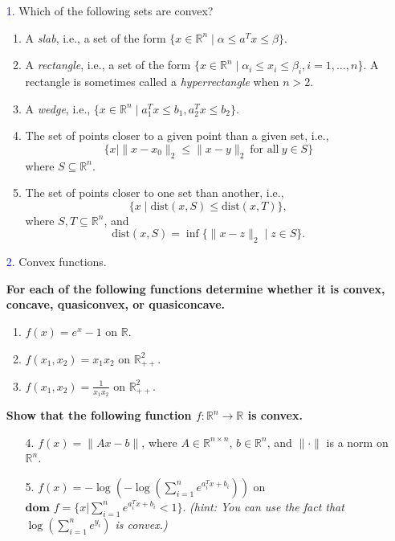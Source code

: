 \documentclass[10pt]{article}
\begin{document}
\begin{itemize}

	\item[\textcolor{blue}{1}.] Which of the following sets are convex?
	
	\begin{enumerate}
	    \item A \textit{slab}, i.e., a set of the form $\{x \in \mathbb{R}^n \mid \alpha \leq a^T x \leq \beta\}$. 
	    \item A \textit{rectangle}, i.e., a set of the form $\{x \in \mathbb{R}^n \mid \alpha_i \leq x_i \leq \beta_i, i = 1, \dots, n\}$. A rectangle is sometimes called a \textit{hyperrectangle} when 			$n > 2$. 
	    \item A \textit{wedge}, i.e., $\{x \in \mathbb{R}^n \mid a_1^T x \leq b_1, a_2^T x \leq b_2\}$. 
	    \item The set of points closer to a given point than a given set, i.e.,
	    \[
	    \{x \mid \|x - x_0\|_2 \leq \|x - y\|_2 \ \text{for all} \ y \in S\}
	    \]
	    where $S \subseteq \mathbb{R}^n$. 
	    \item The set of points closer to one set than another, i.e.,
	    \[
	    \{x \mid \text{dist}(x, S) \leq \text{dist}(x, T)\},
	    \]
	    where $S, T \subseteq \mathbb{R}^n$, and
	    \[
	    \text{dist}(x, S) = \inf \{\|x - z\|_2 \mid z \in S\}.
	    \] 
	\end{enumerate}
	\vspace{1cm}

	\item[\textcolor{blue}{2}.] Convex functions.

	\textbf{ For each of the following functions determine whether it is convex, concave, quasiconvex, or quasiconcave.}	
	\begin{enumerate}
	    \item $f(x) = e^x - 1$ on $\mathbb{R}$. 
	    \item $f(x_1, x_2) = x_1 x_2$ on $\mathbb{R}^2_{++}$. 
	    \item $f(x_1, x_2) = \frac{1}{x_1 x_2}$ on $\mathbb{R}^2_{++}$. 
	\end{enumerate}
	\textbf{Show that the following function $f : \mathbb{R}^n \to \mathbb{R}$ is convex.}	
	\begin{enumerate}
	    \item[4.] $f(x) = \|A x - b\|$, where $A \in \mathbb{R}^{n \times n}$, $b \in \mathbb{R}^n$, and $\|\cdot\|$ is a norm on $\mathbb{R}^n$. 
	    \item[5.] $f(x) = -\log \left( -\log \left( \sum_{i=1}^n e^{a_i^Tx + b_i} \right) \right)$ on $\textbf{dom }f = \{x|\sum_{i=1}^n e^{a_i^Tx + b_i} < 1\}$. \emph{(hint: You can use the fact that $\log \left( \sum_{i=1}^n e^{y_i} \right)$ is convex.)} 
	\end{enumerate}
	

\end{itemize}
\end{document}

